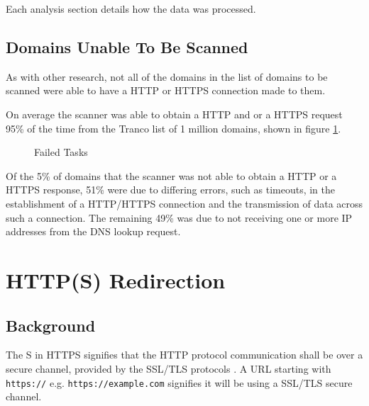 \documentclass{mscreport}
\begin{document}
\vspace{0.3cm} \noindent
Each analysis section details how the data was processed.


\subsection{Domains Unable To Be Scanned}

As with other research, not all of the domains in the list of domains to be scanned were able to have a HTTP or HTTPS connection made to them.

\vspace{0.3cm} \noindent
On average the scanner was able to obtain a HTTP and or a HTTPS request 95\% of the time from the Tranco list of 1 million domains, shown in figure \ref{fig:failed_tasks}.

\begin{figure}[H]
	\begin{center}
		\caption{Failed Tasks}
		\label{fig:failed_tasks}
	\end{center}
\end{figure}

\noindent
Of the 5\% of domains that the scanner was not able to obtain a HTTP or a HTTPS response, 51\% were due to differing errors, such as timeouts, in the establishment of a HTTP/HTTPS connection and the transmission of data across such a connection. The remaining 49\% was due to not receiving one or more IP addresses from the DNS lookup request.


\clearpage 

\newpage

\section{HTTP(S) Redirection}

\subsection{Background}

\noindent
The S in HTTPS signifies that the HTTP protocol communication shall be over a secure channel, provided by the SSL/TLS protocols \cite{Rescorla2000-fs}. A URL starting with \texttt{https://} e.g. \texttt{https://example.com} signifies it will be using a SSL/TLS secure channel.
\end{document}
